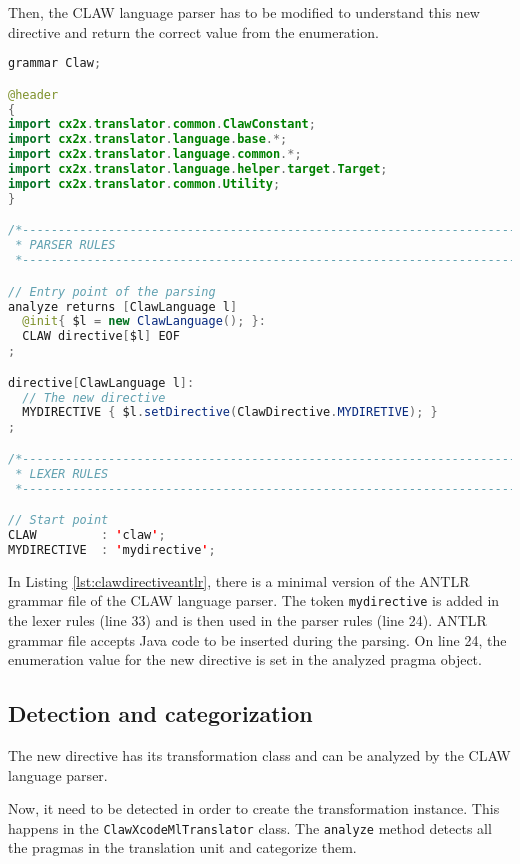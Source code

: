 Then, the CLAW language parser has to be modified to understand this new
directive and return the correct value from the enumeration.

\begin{lstlisting}[label=lst:clawdirectiveantlr, caption=Claw.g4, language=java]
grammar Claw;

@header
{
import cx2x.translator.common.ClawConstant;
import cx2x.translator.language.base.*;
import cx2x.translator.language.common.*;
import cx2x.translator.language.helper.target.Target;
import cx2x.translator.common.Utility;
}

/*----------------------------------------------------------------------------
 * PARSER RULES
 *----------------------------------------------------------------------------*/

// Entry point of the parsing
analyze returns [ClawLanguage l]
  @init{ $l = new ClawLanguage(); }:
  CLAW directive[$l] EOF
;

directive[ClawLanguage l]:
  // The new directive
  MYDIRECTIVE { $l.setDirective(ClawDirective.MYDIRETIVE); }
;

/*----------------------------------------------------------------------------
 * LEXER RULES
 *----------------------------------------------------------------------------*/

// Start point
CLAW         : 'claw';
MYDIRECTIVE  : 'mydirective';
\end{lstlisting}

In Listing \ref{lst:clawdirectiveantlr}, there is a minimal version of the
ANTLR grammar file of the CLAW language parser. The token
\lstinline|mydirective| is added in the lexer rules (line 33) and is then
used in the parser rules (line 24). ANTLR grammar file accepts Java code
to be inserted during the parsing. On line 24, the enumeration value for
the new directive is set in the analyzed pragma object.

\subsection{Detection and categorization}
The new directive has its transformation class and can be analyzed by the
CLAW language parser.

Now, it need to be detected in order to create the transformation instance.
This happens in the \lstinline|ClawXcodeMlTranslator| class. The
\lstinline|analyze| method detects all the pragmas in the translation unit
and categorize them.

